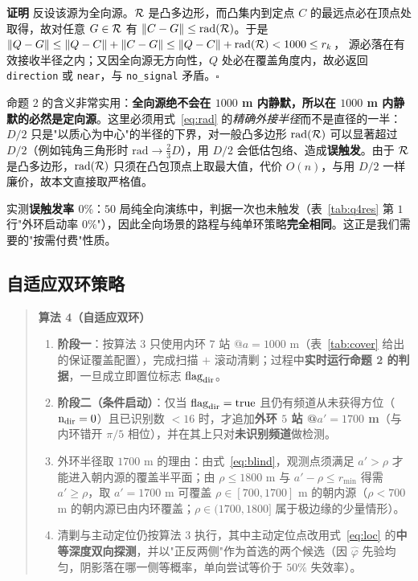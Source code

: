 \noindent\textbf{证明} 反设该源为全向源。$\mathcal{R}$ 是凸多边形，而凸集内到定点 $C$ 的最远点必在顶点处取得，故对任意 $G\in\mathcal{R}$ 有 $\|C-G\|\le\mathrm{rad}(\mathcal{R})$。于是
$\|Q-G\|\le\|Q-C\|+\|C-G\|\le\|Q-C\|+\mathrm{rad}(\mathcal{R})<1000\le r_k$，
源必落在有效接收半径之内；又因全向源无方向性，$Q$ 处必在覆盖角度内，故必返回 \texttt{direction} 或 \texttt{near}，与 \texttt{no\_signal} 矛盾。$\square$

命题 2 的含义非常实用：\textbf{全向源绝不会在 $1000$ m 内静默，所以在 $1000$ m 内静默的必然是定向源}。这里必须用式~\eqref{eq:rad} 的\emph{精确外接半径}而不是直径的一半：$D/2$ 只是"以质心为中心"的半径的下界，对一般凸多边形 $\mathrm{rad}(\mathcal{R})$ 可以显著超过 $D/2$（例如钝角三角形时 $\mathrm{rad}\to\tfrac23D$），用 $D/2$ 会低估包络、造成\textbf{误触发}。由于 $\mathcal{R}$ 是凸多边形，$\mathrm{rad}(\mathcal{R})$ 只须在凸包顶点上取最大值，代价 $O(n)$，与用 $D/2$ 一样廉价，故本文直接取严格值。

实测\textbf{误触发率 $0\%$}：$50$ 局纯全向演练中，判据一次也未触发（表~\ref{tab:q4res} 第 $1$ 行"外环启动率 $0\%$"），因此全向场景的路程与纯单环策略\textbf{完全相同}。这正是我们需要的"按需付费"性质。

\subsection{自适应双环策略}

\begin{quote}
\textbf{算法 4（自适应双环）}
\begin{enumerate}
  \item \textbf{阶段一}：按算法 3 只使用内环 $7$ 站 @$a=1000$ m（表~\ref{tab:cover} 给出的保证覆盖配置），完成扫描 $+$ 滚动清剿；过程中\textbf{实时运行命题 2 的判据}，一旦成立即置位标志 $\mathrm{flag}_{\rm dir}$。
  \item \textbf{阶段二（条件启动）}：仅当 $\mathrm{flag}_{\rm dir}=\text{true}$ 且仍有频道从未获得方位（$\mathrm{n}_{\rm dir}=0$）且已识别数 $<16$ 时，才追加\textbf{外环 $5$ 站 @$a'=1700$ m}（与内环错开 $\pi/5$ 相位），并在其上只对\textbf{未识别频道}做检测。
  \item 外环半径取 $1700$ m 的理由：由式~\eqref{eq:blind}，观测点须满足 $a'>\rho$ 才能进入朝内源的覆盖半平面；由 $\rho\le1800$ m 与 $a'-\rho\le r_{\min}$ 得需 $a'\ge\rho$，取 $a'=1700$ m 可覆盖 $\rho\in[700,1700]$ m 的朝内源（$\rho<700$ m 的朝内源已由内环覆盖；$\rho\in(1700,1800]$ 属于极边缘的少量情形）。
  \item 清剿与主动定位仍按算法 3 执行，其中主动定位点改用式~\eqref{eq:loc} 的\textbf{中等深度双向探测}，并以"正反两侧"作为首选的两个候选（因 $\hat\varphi$ 先验均匀，阴影落在哪一侧等概率，单向尝试等价于 $50\%$ 失效率）。
\end{enumerate}
\end{quote}

